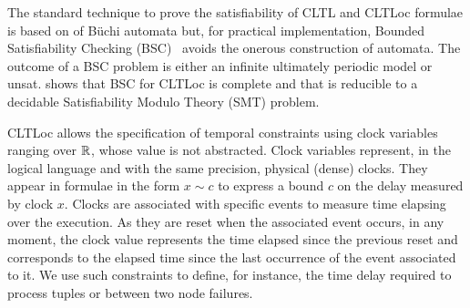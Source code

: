 The standard technique to prove the satisfiability of CLTL and CLTLoc formulae is based on of B\"uchi automata \cite{DD07,BRS15} %
but, for practical implementation, Bounded Satisfiability Checking (BSC)~\cite{MPS13} avoids the onerous construction of automata.
The outcome of a BSC problem is either an infinite ultimately periodic model or unsat.
\cite{BRS15} shows that BSC for CLTLoc is complete and that is reducible to a decidable Satisfiability Modulo Theory (SMT) problem. 

CLTLoc allows the specification of temporal constraints using clock variables ranging over $\mathbb{R}$, whose value is not abstracted.
Clock variables represent, in the logical language and with the same precision, physical (dense) clocks.
They appear in formulae in the form $x \sim c$ to express a bound $c$ on the delay measured by clock $x$. 
Clocks are associated with specific events to measure time elapsing over the execution.
As they are reset when the associated event occurs, in any moment, the clock value represents the time elapsed since the previous reset and corresponds to the elapsed time since the last occurrence of the event associated to it.
We use such constraints to define, for instance, the time delay required to process tuples or between two node failures.



